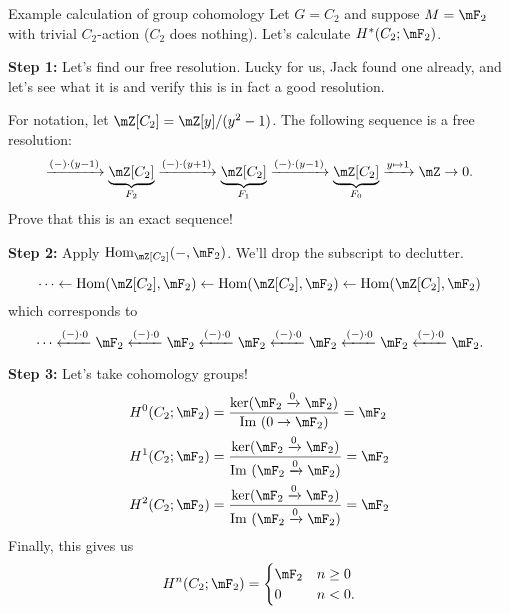 \begin{example}{Example calculation of group cohomology}{}
    Let $G = C_2$ and suppose $M =\mF_2$ with trivial $C_2$-action ($C_2$ does nothing). Let's calculate $H^\ast(C_2;\mF_2)$. 

    \medskip
    \textbf{Step 1:} Let's find our free resolution. Lucky for us, Jack found one already, and let's see what it is and verify this is in fact a good resolution. 

    For notation, let $\mZ[C_2] = \mZ[y]/(y^2-1)$. The following sequence is a free resolution: 
    $$\xr{(-)\cdot(y-1)}\underbrace{\mZ[C_2]}_{F_2}\xr{(-)\cdot(y+1)}\underbrace{\mZ[C_2]}_{F_1}\xr{(-)\cdot (y-1)}\underbrace{\mZ[C_2]}_{F_0}\xr{y\mapsto 1}\mZ\to 0.$$ Prove that this is an exact sequence!

    \medskip
    \textbf{Step 2:} Apply $\Hom_{\mZ[C_2]}(-,\mF_2)$. We'll drop the subscript to declutter. 

    $$\cdots \from \Hom(\mZ[C_2],\mF_2)\from \Hom(\mZ[C_2],\mF_2)\from \Hom(\mZ[C_2],\mF_2)$$ which corresponds to $$\cdots\xleftarrow{(-)\cdot 0} \mF_2\xleftarrow{(-)\cdot 0} \mF_2\xleftarrow{(-)\cdot 0} \mF_2\xleftarrow{(-)\cdot 0} \mF_2\xleftarrow{(-)\cdot 0} \mF_2\xleftarrow{(-)\cdot 0} \mF_2.$$
    
    \medskip
    \textbf{Step 3:} Let's take cohomology groups! 
    \begin{align*}
        H^0(C_2;\mF_2)& = \frac{\ker (\mF_2\xr{0}\mF_2)}{\Im(0\to \mF_2)} = \mF_2\\
        H^1(C_2;\mF_2)& = \frac{\ker (\mF_2\xr{0}\mF_2)}{\Im(\mF_2\xr{0} \mF_2)} = \mF_2\\
        H^2(C_2;\mF_2)& = \frac{\ker (\mF_2\xr{0}\mF_2)}{\Im(\mF_2\xr{0} \mF_2)} = \mF_2\\
    \end{align*}
    Finally, this gives us $$H^n(C_2;\mF_2) = \begin{cases}
        \mF_2 & n\geq 0\\ 
        0 & n< 0.
    \end{cases}$$
\end{example}

